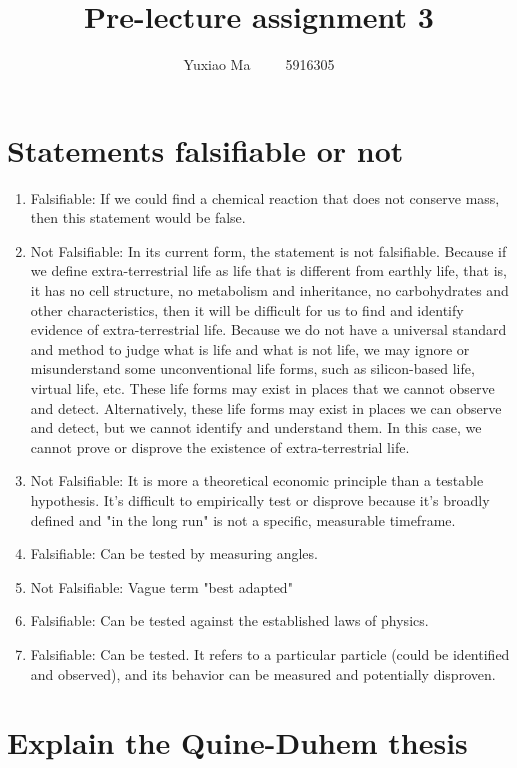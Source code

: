 \documentclass[UTF8,a4paper,AutoFakeBold,AutoFakeSlant]{article}
\title{\textbf{\textsf{{\textsf{Pre-lecture assignment 3}}}}}
\author{\tnewroman Yuxiao Ma~~~~~5916305}
\date{}
\begin{document}
\maketitle


\section{Statements falsifiable or not}

\begin{enumerate}
    \item Falsifiable: If we could find a chemical reaction that does not conserve mass, then this statement would be false.
    \item Not Falsifiable: In its current form, the statement is not falsifiable. Because if we define extra-terrestrial life as life that is different from earthly life, that is, it has no cell structure, no metabolism and inheritance, no carbohydrates and other characteristics, then it will be difficult for us to find and identify evidence of extra-terrestrial life. Because we do not have a universal standard and method to judge what is life and what is not life, we may ignore or misunderstand some unconventional life forms, such as silicon-based life, virtual life, etc. These life forms may exist in places that we cannot observe and detect. Alternatively, these life forms may exist in places we can observe and detect, but we cannot identify and understand them. In this case, we cannot prove or disprove the existence of extra-terrestrial life.
    \item Not Falsifiable: It is more a theoretical economic principle than a testable hypothesis. It's difficult to empirically test or disprove because it's broadly defined and "in the long run" is not a specific, measurable timeframe.
    \item Falsifiable: Can be tested by measuring angles.
    \item Not Falsifiable: Vague term "best adapted"
    \item Falsifiable: Can be tested against the established laws of physics.
    \item Falsifiable: Can be tested. It refers to a particular particle (could be identified and observed), and its behavior can be measured and potentially disproven.
\end{enumerate}


\section{Explain the Quine-Duhem thesis}
\end{document}
